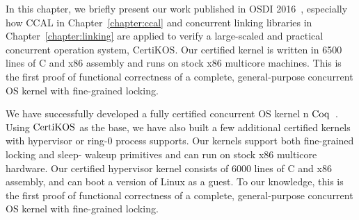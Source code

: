 



In this chapter, we briefly present our work published in OSDI 2016~\cite{certikos:osdi16}, especially 
how CCAL in Chapter~\ref{chapter:ccal} and concurrent linking libraries in Chapter~\ref{chapter:linking} are applied 
to verify a large-scaled and practical concurrent operation system, CertiKOS.
Our certified kernel is written in 6500 lines of C and x86 assembly
and runs on stock x86 multicore machines. This is
the first proof of functional correctness of a complete,
general-purpose concurrent OS kernel with fine-grained locking.


We have successfully developed a fully certified concurrent OS kernel n $\mathrm{Coq}$~\cite{coq}. Using $\mathrm{CertiKOS}$ as the base, we have also built a few additional certified kernels with hypervisor or ring-0 process supports. Our kernels support both fine-grained locking and sleep- wakeup primitives and can run on stock x86 multicore hardware. Our certified hypervisor kernel consists of 6000 lines of C and x86 assembly, and can boot a version of Linux as a guest. To our knowledge, this is the first proof of functional correctness of a complete, general-purpose concurrent OS kernel with fine-grained locking.
